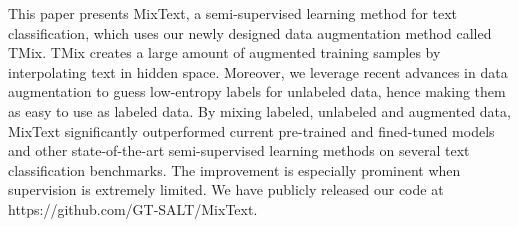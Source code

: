 This paper presents MixText, a semi-supervised learning method for text classification, which uses our newly designed data augmentation method called TMix. TMix creates a large amount of augmented training samples by interpolating text in hidden space. Moreover, we leverage recent advances in data augmentation to guess low-entropy labels for unlabeled data, hence making them as easy to use as labeled data. By mixing labeled, unlabeled and augmented data, MixText significantly outperformed current pre-trained and fined-tuned models and other state-of-the-art semi-supervised learning methods on several text classification benchmarks. The improvement is especially prominent when supervision is extremely limited. We have publicly released our code at https://github.com/GT-SALT/MixText.
